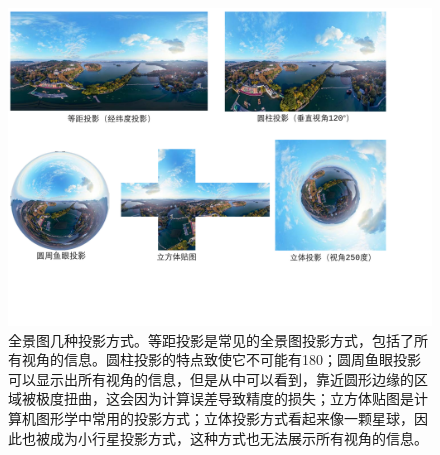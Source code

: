 \begin{figure}[!htbp]
    \centering
    \includegraphics[width=1.0\textwidth]{Img/panorama-projection.pdf}

    \caption[全景图的几种投影方式]
    {
        \label{fig:panorama-projection}
        全景图几种投影方式。等距投影是常见的全景图投影方式，包括了所有视角的信息。圆柱投影的特点致使它不可能有180；圆周鱼眼投影可以显示出所有视角的信息，但是从中可以看到，靠近圆形边缘的区域被极度扭曲，这会因为计算误差导致精度的损失；立方体贴图是计算机图形学中常用的投影方式；立体投影方式看起来像一颗星球，因此也被成为小行星投影方式，这种方式也无法展示所有视角的信息。
    }
\end{figure}